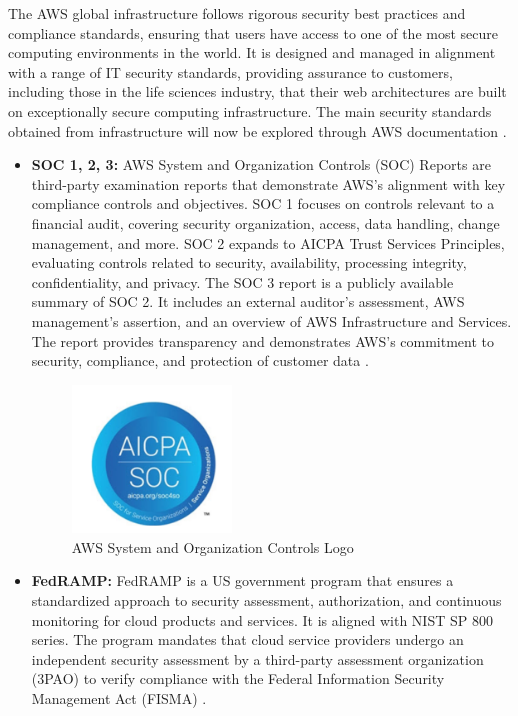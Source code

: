 The AWS global infrastructure follows rigorous security best practices and compliance standards, ensuring that users have access to one of the most secure computing environments in the world. It is designed and managed in alignment with a range of IT security standards, providing assurance to customers, including those in the life sciences industry, that their web architectures are built on exceptionally secure computing infrastructure. The main security standards obtained from infrastructure will now be explored through AWS documentation \cite{AWSCertificationsAndAttestations}. 
\begin{itemize}
    \item \textbf{SOC 1, 2, 3: }AWS System and Organization Controls (SOC) Reports are third-party examination reports that demonstrate AWS's alignment with key compliance controls and objectives. SOC 1 focuses on controls relevant to a financial audit, covering security organization, access, data handling, change management, and more. SOC 2 expands to AICPA Trust Services Principles, evaluating controls related to security, availability, processing integrity, confidentiality, and privacy. The SOC 3 report is a publicly available summary of SOC 2. It includes an external auditor's assessment, AWS management's assertion, and an overview of AWS Infrastructure and Services. The report provides transparency and demonstrates AWS's commitment to security, compliance, and protection of customer data \cite{AWSSOC3}.
    \begin{figure}[h]  %
        \centering
        \includegraphics[width=0.4\textwidth]{images/AWSSOC.png}  %
        \caption{AWS System and Organization Controls Logo}
        \label{fig:AWSSOC}
    \end{figure}
    \item \textbf{FedRAMP:} FedRAMP is a US government program that ensures a standardized approach to security assessment, authorization, and continuous monitoring for cloud products and services. It is aligned with NIST SP 800 series. The program mandates that cloud service providers undergo an independent security assessment by a third-party assessment organization (3PAO) to verify compliance with the  Federal Information Security Management Act (FISMA) \cite{Fedramp}.

\end{itemize}
